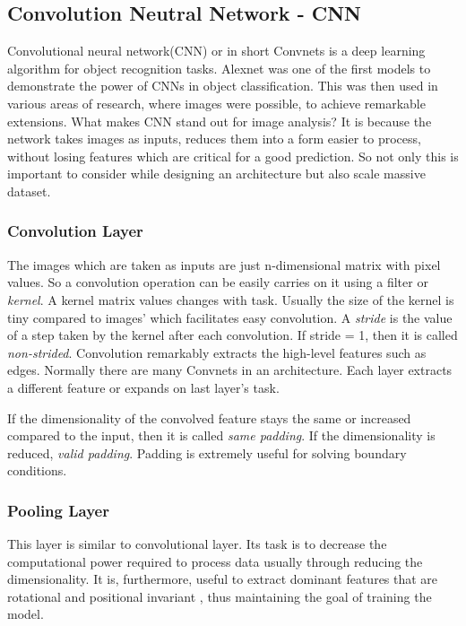 \subsection{Convolution Neutral Network - CNN}
Convolutional neural network(CNN) or in short Convnets is a deep learning algorithm for object recognition
tasks. Alexnet \cite{Alexnet2012} was one of the first models to demonstrate the power of
CNNs in object classification. This was then used in various areas of research, where
images were possible, to achieve remarkable extensions. What makes CNN stand out for image
analysis? It is because the network takes images as inputs, reduces them into a form
easier to process, without losing features which are critical for a good prediction. So
not only this is important to consider while designing an architecture but also scale
massive dataset.
\subsubsection*{Convolution Layer}
\label{subsubsec:convlayer}
The images which are taken as inputs are just n-dimensional matrix with pixel values. So a
convolution operation can be easily carries on it using a filter or \textit{kernel}. A
kernel matrix values changes with task. Usually the size of the kernel is tiny compared to images' which facilitates easy
convolution. A \textit{stride} is the value of a step taken by the kernel after each
convolution. If stride = 1, then it is called \textit{non-strided}. Convolution remarkably
extracts the high-level features such as edges. Normally there are many Convnets in an
architecture. Each layer extracts a different feature or expands on last layer's task.

If the dimensionality of the convolved feature stays the same or increased compared to the
input, then it is called \textit{same padding}. If the dimensionality is reduced,
\textit{valid padding}. Padding is extremely useful for solving boundary conditions.

\subsubsection*{Pooling Layer}
\label{subsubsec:pooling}
This layer is similar to convolutional layer. Its task is to decrease the computational
power required to process data usually through reducing the dimensionality. It is,
furthermore, useful to extract dominant features that are rotational and positional
invariant , thus maintaining the goal of training the model.

